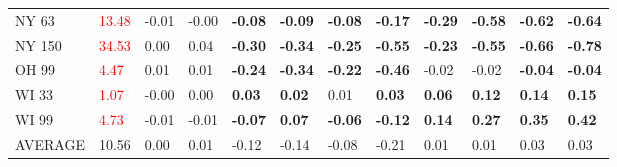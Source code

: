 \begin{tabular}{llllllllllll}
NY 63 & \textcolor{red}{ 13.48 } & -0.01 & -0.00 & \textbf{-0.08} & \textbf{-0.09} & \textbf{-0.08} & \textbf{-0.17} & \textbf{-0.29} & \textbf{-0.58} & \textbf{-0.62} & \textbf{-0.64} \\
NY 150 & \textcolor{red}{ 34.53 } & 0.00 & 0.04 & \textbf{-0.30} & \textbf{-0.34} & \textbf{-0.25} & \textbf{-0.55} & \textbf{-0.23} & \textbf{-0.55} & \textbf{-0.66} & \textbf{-0.78} \\
OH 99 & \textcolor{red}{ 4.47 } & 0.01 & 0.01 & \textbf{-0.24} & \textbf{-0.34} & \textbf{-0.22} & \textbf{-0.46} & -0.02 & -0.02 & \textbf{-0.04} & \textbf{-0.04} \\
WI 33 & \textcolor{red}{ 1.07 } & -0.00 & 0.00 & \textbf{0.03} & \textbf{0.02} & 0.01 & \textbf{0.03} & \textbf{0.06} & \textbf{0.12} & \textbf{0.14} & \textbf{0.15} \\
WI 99 & \textcolor{red}{ 4.73 } & -0.01 & -0.01 & \textbf{-0.07} & \textbf{0.07} & \textbf{-0.06} & \textbf{-0.12} & \textbf{0.14} & \textbf{0.27} & \textbf{0.35} & \textbf{0.42} \\
AVERAGE & 10.56 & 0.00 & 0.01 & -0.12 & -0.14 & -0.08 & -0.21 & 0.01 & 0.01 & 0.03 & 0.03 \\
\bottomrule
\end{tabular}
